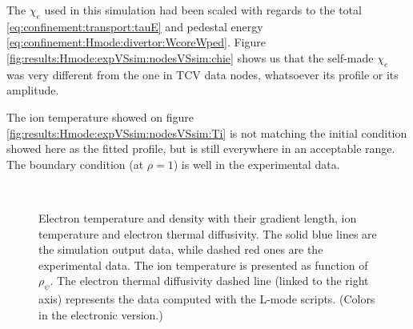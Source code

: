 The $\chi_e$ used in this simulation had been scaled with regards to the total \eqref{eq:confinement:transport:tauE} and pedestal energy \eqref{eq:confinement:Hmode:divertor:WcoreWped}. Figure \ref{fig:results:Hmode:expVSsim:nodesVSsim:chie} shows us that the self-made $\chi_e$ was very different from the one in TCV data nodes, whatsoever its profile or its amplitude.

The ion temperature showed on figure \ref{fig:results:Hmode:expVSsim:nodesVSsim:Ti} is not matching the initial condition showed here as the fitted profile, but is still everywhere in an acceptable range. The boundary condition (at $\rho = 1$) is well in the experimental data.
\begin{figure}[!t]
\begin{center}
\hspace{3mm}
\hspace{3mm}
\\
\hspace{3mm}
\hspace{3mm}
\end{center}
\vspace{-0.7cm}
\caption{\footnotesize Electron temperature and density with their gradient length, ion temperature and electron thermal diffusivity. The solid blue lines are the simulation output data, while dashed red ones are the experimental data. The ion temperature is presented as function of $\rho_{\psi}$. The electron thermal diffusivity dashed line (linked to the right axis) represents the data computed with the L-mode scripts. (Colors in the electronic version.)\label{fig:results:Hmode:expVSsim:nodesVSsim}}
\vspace{-0.5cm}
\end{figure}
